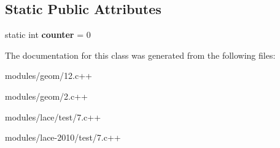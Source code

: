 \subsection*{Static Public Attributes}
\begin{DoxyCompactItemize}
\item 
\hypertarget{classA_ab7a4d4b28a3dddc9f936858223cbeca5}{static int {\bfseries counter} = 0}\label{classA_ab7a4d4b28a3dddc9f936858223cbeca5}

\end{DoxyCompactItemize}


The documentation for this class was generated from the following files\-:\begin{DoxyCompactItemize}
\item 
modules/geom/12.\-c++\item 
modules/geom/2.\-c++\item 
modules/lace/test/7.\-c++\item 
modules/lace-\/2010/test/7.\-c++\end{DoxyCompactItemize}
